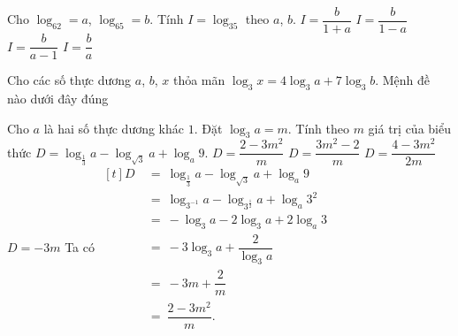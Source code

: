 	\begin{ex}%
		Cho $\log_62=a$, $\log_65=b$. Tính $ I=\log_35$ theo $ a$, $ b$.
		\choice
		{$ I=\dfrac{b}{1+a}$}
		{\True $ I=\dfrac{b}{1-a}$}
		{$ I=\dfrac{b}{a-1}$}
		{$ I=\dfrac{b}{a}$}
	\end{ex}
	\begin{ex}%
		Cho các số thực dương $a$, $b$, $x$ thỏa mãn $\log_3 x=4\log_3 a+7\log_3 b$. Mệnh đề nào dưới đây đúng
	\end{ex}
	\begin{ex}%
		Cho $a$ là hai số thực dương khác $1$. Đặt $\log_3a=m$. Tính theo $m$ giá trị của biểu thức  $D=\log_{\tfrac{1}{3}} a-\log_{\sqrt{3}} a+\log_a 9$.
		\choice 
		{\True $D=\dfrac{2-3m^2}{m}$}
		{$D=\dfrac{3m^2-2}{m}$}
		{$D=\dfrac{4-3m^2}{2m}$}
		{$D=-3m$}
		\loigiai 
		{Ta có $\begin{aligned}[t]
				D&\ =\ \log_{\tfrac{1}{3}} a-\log_{\sqrt{3}} a+\log_a 9\\
				&\ =\ \log_{3^{-1}} a- \log_{3^{\frac{1}{2}}} a+ \log_a 3^2\\
				&\ =\ -\log_3 a-2 \log_3 a+2 \log_a 3\\
				&\ =\ -3 \log_3 a+\dfrac{2}{\log_3 a}\\
				&\ =\ -3 m+\dfrac{2}{m}\\
				&\ =\ \dfrac{2-3 m^2}{m}.
			\end{aligned}$
		}
	\end{ex}

